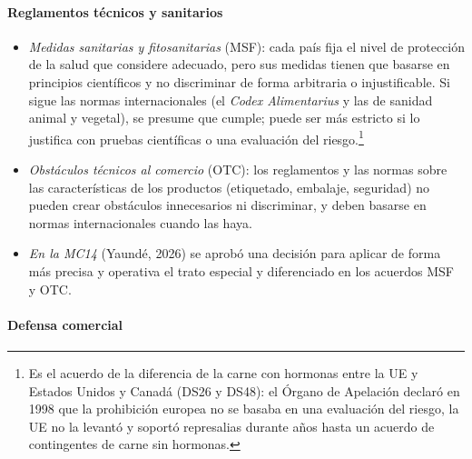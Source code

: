 \documentclass[11pt]{article}
\begin{document}
\paragraph{Reglamentos técnicos y sanitarios}

\begin{itemize}
\item \emph{Medidas sanitarias y fitosanitarias} (MSF): cada país fija el nivel de protección de la salud que considere adecuado, pero sus medidas tienen que basarse en principios científicos y no discriminar de forma arbitraria o injustificable. Si sigue las normas internacionales (el \emph{Codex Alimentarius} y las de sanidad animal y vegetal), se presume que cumple; puede ser más estricto si lo justifica con pruebas científicas o una evaluación del riesgo\nocite{OMC1994MSF,OMC2026EntenderMSF}.\footnote{Es el acuerdo de la diferencia de la carne con hormonas entre la UE y Estados Unidos y Canadá (DS26 y DS48): el Órgano de Apelación declaró en 1998 que la prohibición europea no se basaba en una evaluación del riesgo, la UE no la levantó y soportó represalias durante años hasta un acuerdo de contingentes de carne sin hormonas.}
\item \emph{Obstáculos técnicos al comercio} (OTC): los reglamentos y las normas sobre las características de los productos (etiquetado, embalaje, seguridad) no pueden crear obstáculos innecesarios ni discriminar, y deben basarse en normas internacionales cuando las haya\nocite{OMC1994OTC}.
\item \emph{En la MC14} (Yaundé, 2026) se aprobó una decisión para aplicar de forma más precisa y operativa el trato especial y diferenciado en los acuerdos MSF y OTC\nocite{OMC2026CG0605}.
\end{itemize}

\paragraph{Defensa comercial}
\end{document}
